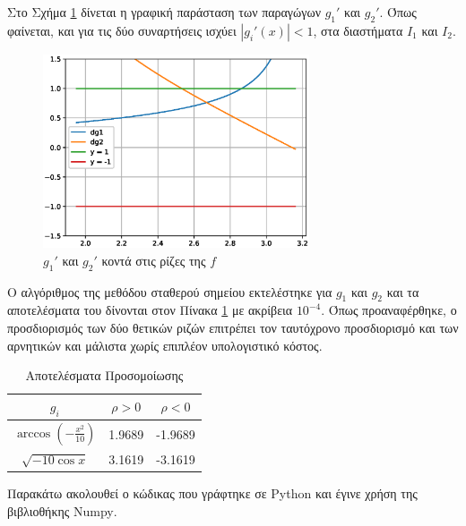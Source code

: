\documentclass[assignment2.tex]{subfiles}
\begin{document}
Στο Σχήμα \ref{fig:dg1_dg2} δίνεται η γραφική παράσταση των παραγώγων $g_1'$ και $g_2'$. Όπως φαίνεται, και για τις δύο συναρτήσεις ισχύει $|g_i'(x)|<1$, στα διαστήματα $I_1$ και $I_2$.
\begin{figure}[hp]
\includegraphics[width=0.7\textwidth]{dg1_dg2.eps}
\centering
\caption{$g_1'$ και $g_2'$ κοντά στις ρίζες της $f$}
\label{fig:dg1_dg2}
\end{figure} 

Ο αλγόριθμος της μεθόδου σταθερού σημείου εκτελέστηκε για $g_1$ και $g_2$ και τα αποτελέσματα του δίνονται στον Πίνακα \ref{table:fixed_point} με ακρίβεια $10^{-4}$. Όπως προαναφέρθηκε, ο προσδιορισμός των δύο θετικών ριζών επιτρέπει τον ταυτόχρονο προσδιορισμό και των αρνητικών και μάλιστα χωρίς επιπλέον υπολογιστικό κόστος.

\begin{table}[ht]
\centering
\begin{tabular}{||c c c||} 
	\hline
	$g_i$& $\rho>0$ & $\rho<0$ \\ [0.5ex] 
	\hline\hline
	$\arccos \left(-\frac{x^2}{10}\right)$ & 1.9689 & -1.9689 \\ 
	\hline
	$\sqrt{-10\cos x}$ & 3.1619 & -3.1619 \\ [1ex] 
	\hline
\end{tabular}
\caption{Αποτελέσματα Προσομοίωσης}
\label{table:fixed_point}
\end{table}

Παρακάτω ακολουθεί ο κώδικας που γράφτηκε σε \textlatin{Python} και έγινε χρήση της βιβλιοθήκης \textlatin{Numpy}.

\end{document}
